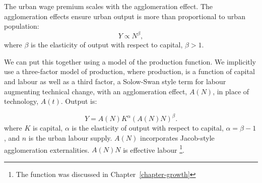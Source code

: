 
The urban wage premium scales with the agglomeration effect. The \glspl{agglomeration effect} ensure urban \gls{output} is more than proportional to urban population: 
 \begin{equation}
 Y\propto N^{\beta},
 \label{eqn-production-population}
 \end{equation}
where $\beta$ is the elasticity of output with respect to capital,  $\beta >1$.   

We can put this together using a model of the production function. We implicitly use a three-factor model of \gls{production}, where production, is a function of capital and labour as well as a third factor, a Solow-Swan style term for labour augmenting technical change, with an \gls{agglomeration} effect, $A(N)$, in place of technology, $A(t)$. Output is:

\begin{equation}
Y=A(N)K^{\alpha }(A(N)N)^\beta.
\label{eqn-prod1}
\end{equation}
where $K$ is capital, $\alpha$ is the elasticity of output with respect to capital, $\alpha = \beta - 1$, and  $n$ is the \gls{urban labour supply}. $A(N)$ incorporates Jacob-style agglomeration externalities. $A(N)N$ is \gls{effective labour} \footnote{The function  was discussed in Chapter~\ref{chapter-growth}}. 

